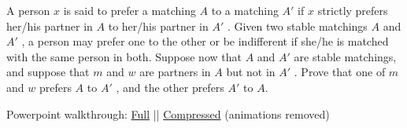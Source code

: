 \question A person $x$ is said to prefer a matching $A$ to a 
matching $A$\ensuremath{'} if $x$ strictly prefers her/his partner 
in $A$ to her/his partner in $A$\ensuremath{'} . Given two stable 
matchings $A$ and $A$\ensuremath{'} , a person may prefer one to 
the other or be indifferent if she/he is matched with the same person 
in both. Suppose now that $A$ and $A$\ensuremath{'} are stable 
matchings, and suppose that $m$ and $w$ are partners in $A$ but not 
in $A$\ensuremath{'} . Prove that one of $m$ and $w$ prefers $A$ to 
$A$\ensuremath{'} , and the other prefers $A$\ensuremath{'} to $A$.

\begin{solution}
Powerpoint walkthrough: 
\href{file:../topics/stable_marriage/please.pdf}{Full} ||
\href{file:../topics/stable_marriage/please_compressed.pdf}{Compressed} (animations removed)
\end{solution}

\clearpage